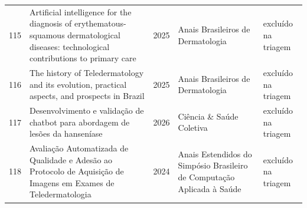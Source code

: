 \begin{longtable}{@{}lp{6.4cm}lp{3.1cm}p{3.2cm}@{}}
\hypertarget{estudo:115}{115} & Artificial intelligence for the diagnosis of erythematous-squamous dermatological diseases: technological contributions to primary care & 2025 & Anais Brasileiros de Dermatologia & exclu\'ido na triagem \\
\hypertarget{estudo:116}{116} & The history of Teledermatology and its evolution, practical aspects, and prospects in Brazil & 2025 & Anais Brasileiros de Dermatologia & exclu\'ido na triagem \\
\hypertarget{estudo:117}{117} & Desenvolvimento e validação de chatbot para abordagem de lesões da hanseníase & 2026 & Ciência \& Saúde Coletiva & exclu\'ido na triagem \\
\hypertarget{estudo:118}{118} & Avaliação Automatizada de Qualidade e Adesão ao Protocolo de Aquisição de Imagens em Exames de Teledermatologia & 2024 & Anais Estendidos do Simpósio Brasileiro de Computação Aplicada à Saúde & exclu\'ido na triagem \\
\end{longtable}
\endgroup
{}

